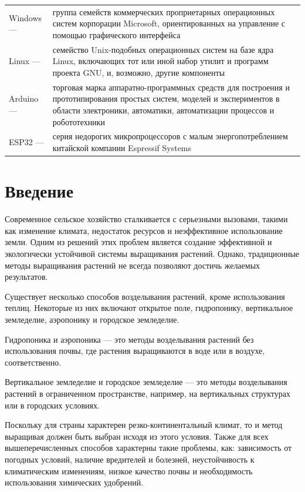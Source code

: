 \documentclass{altsu-bachelor}
\begin{document}
\begin{longtable}{p{4cm} p{12cm}}
    Windows --- & группа семейств коммерческих проприетарных операционных систем корпорации Microsoft, ориентированных на управление с помощью графического интерфейса \\
    Linux --- & семейство Unix-подобных операционных систем на базе ядра Linux, включающих тот или иной набор утилит и программ проекта GNU, и, возможно, другие компоненты \\
    Arduino --- & торговая марка аппаратно-программных средств для построения и прототипирования простых систем, моделей и экспериментов в области электроники, автоматики, автоматизации процессов и робототехники \\
    ESP32 --- & серия недорогих микропроцессоров с малым энергопотреблением китайской компании Espressif Systems \\
\end{longtable}
\label{tab:my_label}

\chapter*{Введение}

Современное сельское хозяйство сталкивается с серьезными вызовами, такими как изменение климата, недостаток ресурсов и неэффективное использование земли. Одним из решений этих проблем является создание эффективной и экологически устойчивой системы выращивания растений. Однако, традиционные методы выращивания растений не всегда позволяют достичь желаемых результатов.

Существует несколько способов возделывания растений, кроме использования теплиц. Некоторые из них включают открытое поле, гидропонику, вертикальное земледелие, аэропонику и городское земледелие.

Гидропоника и аэропоника --- это методы возделывания растений без использования почвы, где растения выращиваются в воде или в воздухе, соответственно.

Вертикальное земледелие и городское земледелие --- это методы возделывания растений в ограниченном пространстве, например, на вертикальных структурах или в городских условиях.

Поскольку для страны характерен резко-континентальный климат, то и метод выращивая должен быть выбран исходя из этого условия. Также для всех вышеперечисленных способов характерны такие проблемы, как: зависимость от погодных условий, наличие вредителей и болезней, неустойчивость к климатическим изменениям, низкое качество почвы и необходимость использования химических удобрений.
\end{document}
